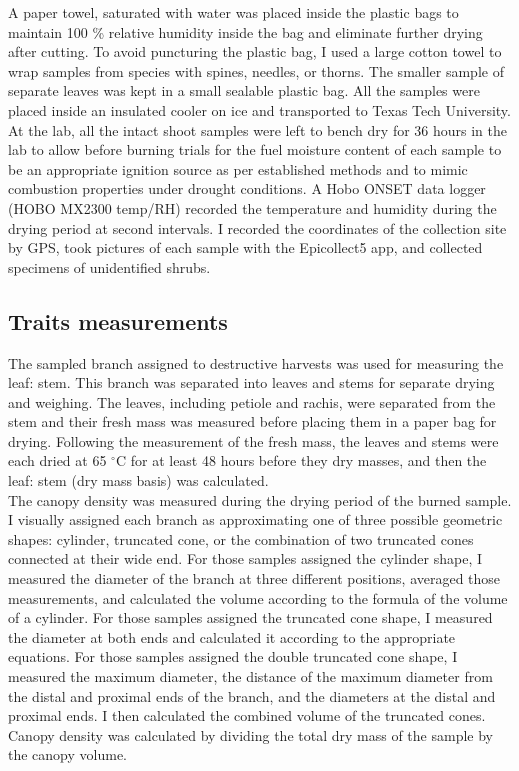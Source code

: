 \documentclass[12pt]{report}
\begin{document}
A paper towel, saturated with water was placed inside the plastic bags to maintain 100 \% relative humidity inside the bag and eliminate further drying after cutting. To avoid puncturing the plastic bag, I used a large cotton towel to wrap samples from species with spines, needles, or thorns. The smaller sample of separate leaves was kept in a small sealable plastic bag. All the samples were placed inside an insulated cooler on ice and transported to Texas Tech University. At the lab, all the intact shoot samples were left to bench dry for 36 hours in the lab to allow before burning trials for the fuel moisture content of each sample to be an appropriate ignition source as per established methods \citep{wyse2016quantitative} and to mimic combustion properties under drought conditions. A Hobo ONSET data logger (HOBO MX2300 temp/RH) recorded the temperature and humidity during the drying period at second intervals. I recorded the coordinates of the collection site by GPS, took pictures of each sample with the Epicollect5 app, and collected specimens of unidentified shrubs.



\subsection{Traits measurements}
The sampled branch assigned to destructive harvests was used for measuring the leaf: stem. This branch was separated into leaves and stems for separate drying and weighing. The leaves, including petiole and rachis, were separated from the stem and their fresh mass was measured before placing them in a paper bag for drying. Following the measurement of the fresh mass, the leaves and stems were each dried at 65 $^{\circ}$C for at least 48 hours before they dry masses, and then the leaf: stem (dry mass basis) was calculated.\\


The canopy density was measured during the drying period of the burned sample. I visually assigned each branch as approximating one of three possible geometric shapes: cylinder, truncated cone, or the combination of two truncated cones connected at their wide end. For those samples assigned the cylinder shape, I measured the diameter of the branch at three different positions, averaged those measurements, and calculated the volume according to the formula of the volume of a cylinder. For those samples assigned the truncated cone shape, I measured the diameter at both ends and calculated it according to the appropriate equations. For those samples assigned the double truncated cone shape, I measured the maximum diameter, the distance of the maximum diameter from the distal and proximal ends of the branch, and the diameters at the distal and proximal ends. I then calculated the combined volume of the truncated cones. Canopy density was calculated by dividing the total dry mass of the sample by the canopy volume.\\
\end{document}
